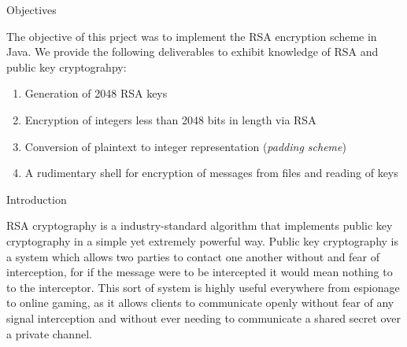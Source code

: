 \documentclass[landscape,a0paper,fontscale=.46]{baposter} %
\newcommand{\compresslist}{ %
\setlength{\itemsep}{1pt}
\setlength{\parskip}{0pt}
\setlength{\parsep}{0pt}
}
\begin{document}
\begin{poster}

\begin{posterbox}[name=objectives,column=0,row=0]{Objectives}

The objective of this prject was to implement the RSA encryption scheme in Java. We provide the following deliverables to exhibit knowledge of RSA and public key cryptograhpy:

\begin{enumerate}\compresslist
\item Generation of 2048 RSA keys
\item Encryption of integers less than 2048 bits in length via RSA
\item Conversion of plaintext to integer representation (\emph{padding scheme})
\item A rudimentary shell for encryption of messages from files and reading of keys
\end{enumerate}

\vspace{0.3em} %
\end{posterbox}


\begin{posterbox}[name=intro,column=0,below=objectives]{Introduction}

RSA cryptography is a industry-standard algorithm that implements public key cryptography in a simple yet extremely powerful way. Public key cryptography is a system which allows two parties to contact one another without and fear of interception, for if the message were to be intercepted it would mean nothing to to the interceptor. This sort of system is highly useful everywhere from espionage to online gaming, as it allows clients to communicate openly without fear of any signal interception and without ever needing to communicate a shared secret over a private channel.


\end{posterbox}
\end{poster}
\end{document}

